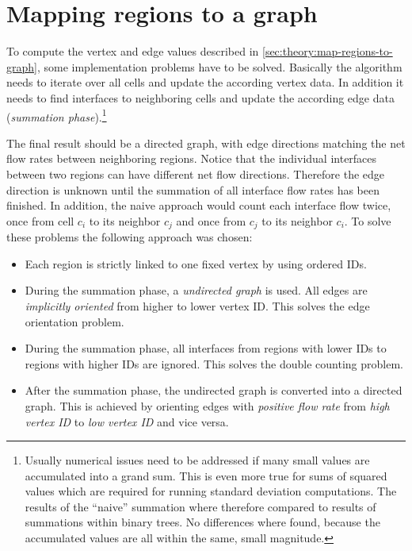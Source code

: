 \section{Mapping regions to a graph}
\label{sec:impl:map-regions-to-graph}

%
To compute the vertex and edge values described in \autoref{sec:theory:map-regions-to-graph}, some implementation problems have to be solved. Basically the algorithm needs to iterate over all cells and update the according vertex data. In addition it needs to find interfaces to neighboring cells and update the according edge data (\emph{summation phase}).\footnote{Usually numerical issues need to be addressed if many small values are accumulated into a grand sum. This is even more true for sums of squared values which are required for running standard deviation computations. The results of the ``naive'' summation where therefore compared to results of summations within binary trees. No differences where found, because the accumulated values are all within the same, small magnitude.}

The final result should be a directed graph, with edge directions matching the net flow rates between neighboring regions. Notice that the individual interfaces between two regions can have different net flow directions. Therefore the edge direction is unknown until the summation of all interface flow rates has been finished. In addition, the naive approach would count each interface flow twice, once from cell $c_i$ to its neighbor $c_j$ and once from $c_j$ to its neighbor $c_i$.
To solve these problems the following approach was chosen:

\begin{itemize}
%
	\item Each region is strictly linked to one fixed vertex by using ordered \acp{ID}.
%
	\item During the summation phase, a \emph{undirected graph} is used. All edges are \emph{implicitly oriented} from higher to lower vertex \ac{ID}. This solves the edge orientation problem.
%
	\item During the summation phase, all interfaces from regions with lower \acp{ID} to regions with higher \acp{ID} are ignored. This solves the double counting problem.
%
	\item After the summation phase, the undirected graph is converted into a directed graph. This is achieved by orienting edges with \emph{positive flow rate} from \emph{high vertex \ac{ID}} to \emph{low vertex \ac{ID}} and vice versa.%
%
\end{itemize}

